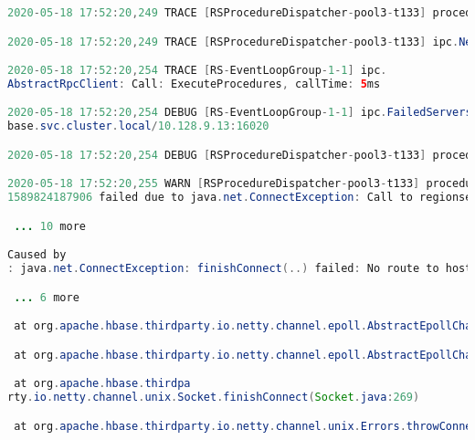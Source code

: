 \documentclass{report}%
\begin{document}
\begin{enumerate}
\begin{lstlisting}[language=java]
2020-05-18 17:52:20,249 TRACE [RSProcedureDispatcher-pool3-t133] procedure.RSProcedureDispatcher: Building request with operations count=1

2020-05-18 17:52:20,249 TRACE [RSProcedureDispatcher-pool3-t133] ipc.NettyRpcConnection: Connecting to regionserver-1.hbase.hbase.svc.cluster.local/10.128.9.13:16020

2020-05-18 17:52:20,254 TRACE [RS-EventLoopGroup-1-1] ipc.
AbstractRpcClient: Call: ExecuteProcedures, callTime: 5ms

2020-05-18 17:52:20,254 DEBUG [RS-EventLoopGroup-1-1] ipc.FailedServers: Added failed server with address regionserver-1.hbase.hbase.svc.cluster.local/10.128.9.13:16020 to list caused by org.apache.hbase.thirdparty.io.netty.channel.AbstractChannel$AnnotatedConnectException: finishConnect(..) failed: No route to host: regionserver-1.hbase.h
base.svc.cluster.local/10.128.9.13:16020

2020-05-18 17:52:20,254 DEBUG [RSProcedureDispatcher-pool3-t133] procedure.RSProcedureDispatcher: request to regionserver-1.hbase.hbase.svc.cluster.local,16020,1589824187906 failed, try=1480

2020-05-18 17:52:20,255 WARN [RSProcedureDispatcher-pool3-t133] procedure.RSProcedureDispatcher: request to server regionserver-1.hbase.hbase.svc.cluster.local,16020,
1589824187906 failed due to java.net.ConnectException: Call to regionserver-1.hbase.hbase.svc.cluster.local/10.128.9.13:16020 failed on connection exception: org.apache.hbase.thirdparty.io.netty.channel.AbstractChannel$AnnotatedConnectException: finishConnect(..) failed: No route to host: regionserver-1.hbase.hbase.svc.cluster.local/10.128.9.13:16020, try=1480, retrying...

 ... 10 more

Caused by
: java.net.ConnectException: finishConnect(..) failed: No route to host

 ... 6 more

 at org.apache.hbase.thirdparty.io.netty.channel.epoll.AbstractEpollChannel$AbstractEpollUnsafe.finishConnect(AbstractEpollChannel.java:644)

 at org.apache.hbase.thirdparty.io.netty.channel.epoll.AbstractEpollChannel$AbstractEpollUnsafe.doFinishConnect(AbstractEpollChannel.java:667)

 at org.apache.hbase.thirdpa
rty.io.netty.channel.unix.Socket.finishConnect(Socket.java:269)

 at org.apache.hbase.thirdparty.io.netty.channel.unix.Errors.throwConnectException(Errors.java:112)


\end{lstlisting}
\end{enumerate}
\end{document}
